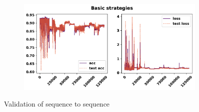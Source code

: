 \begin{figure}[!htbp]
    \begin{subfigure}{\textwidth}
    \centering
    \includegraphics[width=.8\textwidth]{src/chapters/07/img/validation_plot_basic_strategies.pdf}
    \end{subfigure}
    \caption{Validation of sequence to sequence}\label{fig:validation_sequence_to_sequence}
\end{figure}


